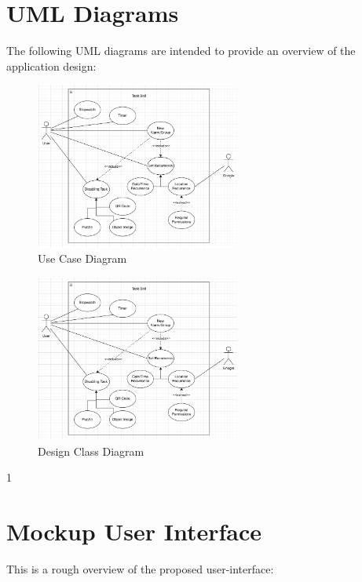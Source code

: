 \documentclass{article}
\begin{document}
\section{UML Diagrams}
The following UML diagrams are intended to provide an overview of the application design:
\begin{figure}[h!]
    \centering
    \includegraphics[width=0.6\textwidth, height=0.3\textheight]{../Use_Case_Diagram.png}
    \caption{Use Case Diagram}
\end{figure}
\begin{figure}[h!]
    \centering
    \includegraphics[width=0.6\textwidth, height=0.3\textheight]{../Use_Case_Diagram.png}
    \caption{Design Class Diagram}
\end{figure}1

\section{Mockup User Interface}
This is a rough overview of the proposed user-interface:
\end{document}
